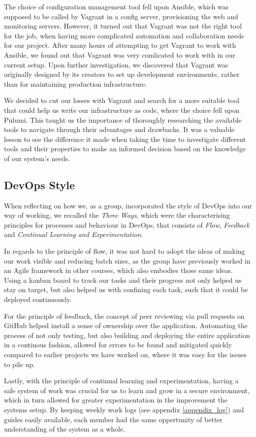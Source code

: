 The choice of configuration management tool fell upon Ansible, which was supposed to be called by Vagrant in a config server, provisioning the web and monitoring servers.
However, it turned out that Vagrant was not the right tool for the job, when having more complicated automation and collaboration needs for our project.
After many hours of attempting to get Vagrant to work with Ansible, we found out that Vagrant was very comlicated to work with in our current setup\cite{issue178-vagrant-ansible}. Upon further investigation, we discovered that Vagrant was originally designed by its creators to set up development environments, rather than for maintaining production infrastructure\cite{vagrant_vs_terraform}.

We decided to cut our losses with Vagrant and search for a more suitable tool that could help us write our infrastructure as code, where the choice fell upon Pulumi.
This taught us the importance of thoroughly researching the available tools to navigate through their advantages and drawbacks.
It was a valuable lesson to see the difference it made when taking the time to investigate different tools and their properties to make an informed decision based on the knowledge of our system's needs.

\subsection{DevOps Style}
When reflecting on how we, as a group, incorporated the style of DevOps into our way of working, we recalled the \textit{Three Ways}, which were the characterising principles for processes and behaviour in DevOps, that consists of \textit{Flow}, \textit{Feedback} and \textit{Continual Learning and Experimentation}\cite{devopshandbook}.

In regards to the principle of flow, it was not hard to adopt the ideas of making our work visible and reducing batch sizes, as the group have previously worked in an Agile framework in other courses, which also embodies those same ideas. Using a kanban board to track our tasks and their progress not only helped us stay on target, but also helped us with confining each task, such that it could be deployed continuously\cite{devopshandbook}.

For the principle of feedback, the concept of peer reviewing via pull requests on GitHub helped install a sense of ownership over the application. Automating the process of not only testing, but also building and deploying the entire application in a continous fashion, allowed for errors to be found and mitigated quickly compared to earlier projects we have worked on, where it was easy for the issues to pile up.

Lastly, with the principle of continual learning and experimentation, having a safe system of work\cite{devopshandbook} was crucial for us to learn and grow in a secure environment, which in turn allowed for greater experimentation in the improvement the systems setup. By keeping weekly work logs (see appendix \ref{appendix_log}) and guides easily available, each member had the same oppertunity of better understanding of the system as a whole.
